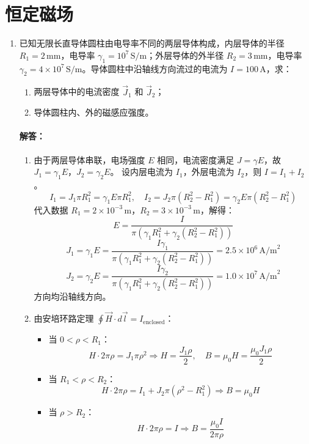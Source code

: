 \section{恒定磁场}
\begin{enumerate}
    \item 已知无限长直导体圆柱由电导率不同的两层导体构成，内层导体的半径 $R_1=2\,\text{mm}$，电导率 $\gamma_1=10^7\,\text{S/m}$；外层导体的外半径 $R_2=3\,\text{mm}$，电导率 $\gamma_2=4\times10^7\,\text{S/m}$。导体圆柱中沿轴线方向流过的电流为 $I=100\,\text{A}$，求：
    \begin{enumerate}
        \item 两层导体中的电流密度 $\vec{J}_1$ 和 $\vec{J}_2$；
        \item 导体圆柱内、外的磁感应强度。
    \end{enumerate}

    \paragraph{解答：}
    \begin{enumerate}
        \item 由于两层导体串联，电场强度 $E$ 相同，电流密度满足 $J=\gamma E$，故 $J_1=\gamma_1 E$，$J_2=\gamma_2 E$。
        设内层电流为 $I_1$，外层电流为 $I_2$，则 $I=I_1+I_2$。
        \[
        I_1 = J_1 \pi R_1^2 = \gamma_1 E \pi R_1^2, \quad I_2 = J_2 \pi (R_2^2-R_1^2) = \gamma_2 E \pi (R_2^2-R_1^2)
        \]
        代入数据 $R_1=2\times10^{-3}\,\text{m}$，$R_2=3\times10^{-3}\,\text{m}$，解得：
        \[
        E = \frac{I}{\pi\left(\gamma_1 R_1^2 + \gamma_2(R_2^2-R_1^2)\right)}
        \]
        \[
        J_1 = \gamma_1 E = \frac{I \gamma_1}{\pi\left(\gamma_1 R_1^2 + \gamma_2(R_2^2-R_1^2)\right)} = 2.5\times10^6\,\text{A/m}^2
        \]
        \[
        J_2 = \gamma_2 E = \frac{I \gamma_2}{\pi\left(\gamma_1 R_1^2 + \gamma_2(R_2^2-R_1^2)\right)} = 1.0\times10^7\,\text{A/m}^2
        \]
        方向均沿轴线方向。

        \item 由安培环路定理 $\oint \vec{H}\cdot d\vec{l}=I_{\text{enclosed}}$：
        \begin{itemize}
            \item 当 $0<\rho<R_1$：
            \[
            H \cdot 2\pi\rho = J_1 \pi\rho^2 \Rightarrow H = \frac{J_1 \rho}{2}, \quad B = \mu_0 H = \frac{\mu_0 J_1 \rho}{2}
            \]
            \item 当 $R_1<\rho<R_2$：
            \[
            H \cdot 2\pi\rho = I_1 + J_2 \pi(\rho^2-R_1^2) \Rightarrow B = \mu_0 H
            \]
            \item 当 $\rho>R_2$：
            \[
            H \cdot 2\pi\rho = I \Rightarrow B = \frac{\mu_0 I}{2\pi\rho}
            \]
        \end{itemize}
    \end{enumerate}


\end{enumerate}
